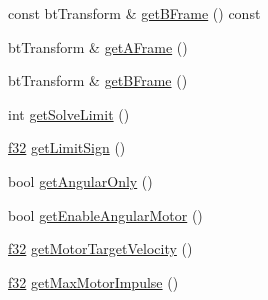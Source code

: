 \begin{DoxyCompactItemize}
\item 
const bt\+Transform \& \mbox{\hyperlink{classnjli_1_1_physics_constraint_hinge_a49de84bc56852c3c5b75d488e4a755c5}{get\+B\+Frame}} () const
\item 
bt\+Transform \& \mbox{\hyperlink{classnjli_1_1_physics_constraint_hinge_a5c98e610aa6f1a2efb8f35ac8450c1c3}{get\+A\+Frame}} ()
\item 
bt\+Transform \& \mbox{\hyperlink{classnjli_1_1_physics_constraint_hinge_a2f14b879a49458109f66fc0f78d51a25}{get\+B\+Frame}} ()
\item 
int \mbox{\hyperlink{classnjli_1_1_physics_constraint_hinge_ac579e32bc5bb6a7d1f3ac9dfc3f94d32}{get\+Solve\+Limit}} ()
\item 
\mbox{\hyperlink{_util_8h_a5f6906312a689f27d70e9d086649d3fd}{f32}} \mbox{\hyperlink{classnjli_1_1_physics_constraint_hinge_a4e4531b90a04163f97716276d0bb0c81}{get\+Limit\+Sign}} ()
\item 
bool \mbox{\hyperlink{classnjli_1_1_physics_constraint_hinge_a703a002e1683957b19e4623299ff414f}{get\+Angular\+Only}} ()
\item 
bool \mbox{\hyperlink{classnjli_1_1_physics_constraint_hinge_a3bb7a607cc9fb96b1a56093aac70731b}{get\+Enable\+Angular\+Motor}} ()
\item 
\mbox{\hyperlink{_util_8h_a5f6906312a689f27d70e9d086649d3fd}{f32}} \mbox{\hyperlink{classnjli_1_1_physics_constraint_hinge_aefd276bcb6fd0e6152b6f5e102350ef3}{get\+Motor\+Target\+Velocity}} ()
\item 
\mbox{\hyperlink{_util_8h_a5f6906312a689f27d70e9d086649d3fd}{f32}} \mbox{\hyperlink{classnjli_1_1_physics_constraint_hinge_a03960cf6d81fc9496f662e537e379d0a}{get\+Max\+Motor\+Impulse}} ()
\end{DoxyCompactItemize}
